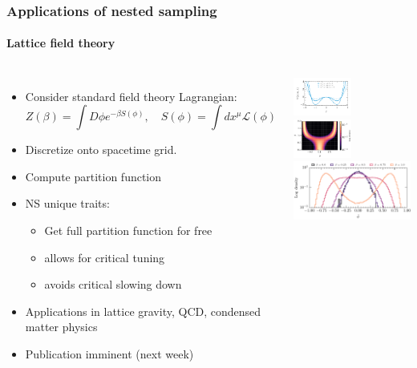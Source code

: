 \documentclass[aspectratio=169]{beamer}
\begin{document}
\begin{frame}
    \frametitle{Applications of nested sampling}
    \framesubtitle{Lattice field theory}
    \begin{columns}
        \begin{itemize}
            \item Consider standard field theory Lagrangian:
                \[ Z(\beta) = \int D\phi e^{-\beta S(\phi)}, \quad S(\phi) = \int dx^\mu \mathcal{L}(\phi) \]
            \item Discretize onto spacetime grid.
            \item Compute partition function
            \item NS unique traits:
                \begin{itemize}
                    \item Get full partition function for free
                    \item allows for critical tuning
                    \item avoids critical slowing down
                \end{itemize}
            \item Applications in lattice gravity, QCD, condensed matter physics
            \item Publication imminent (next week)
        \end{itemize}
        \includegraphics[width=0.49\textwidth]{figures/potential_shape}
        \includegraphics[width=0.49\textwidth]{figures/2d_phase}
        \includegraphics[width=\textwidth]{figures/lattice_field_theory.pdf}

\end{columns}
\end{frame}
\end{document}
